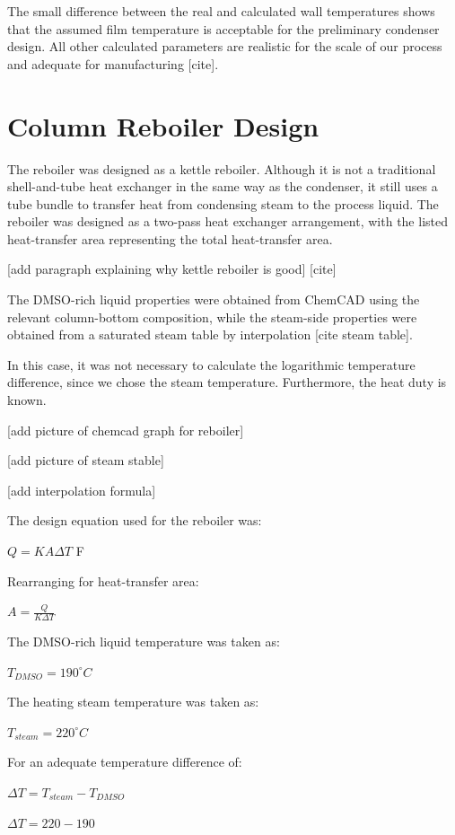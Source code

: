 The small difference between the real and calculated wall temperatures
shows that the assumed film temperature is acceptable for the
preliminary condenser design. All other calculated parameters are
realistic for the scale of our process and adequate for manufacturing
{[}cite{]}.

\section{Column Reboiler Design}\label{column-reboiler-design}

The reboiler was designed as a kettle reboiler. Although it is not a
traditional shell-and-tube heat exchanger in the same way as the
condenser, it still uses a tube bundle to transfer heat from condensing
steam to the process liquid. The reboiler was designed as a two-pass
heat exchanger arrangement, with the listed heat-transfer area
representing the total heat-transfer area.

{[}add paragraph explaining why kettle reboiler is good{]} {[}cite{]}

The DMSO-rich liquid properties were obtained from ChemCAD using the
relevant column-bottom composition, while the steam-side properties were
obtained from a saturated steam table by interpolation {[}cite steam
table{]}.

In this case, it was not necessary to calculate the logarithmic
temperature difference, since we chose the steam temperature.
Furthermore, the heat duty is known.

{[}add picture of chemcad graph for reboiler{]}

{[}add picture of steam stable{]}

{[}add interpolation formula{]}

The design equation used for the reboiler was:

\(Q = K A \Delta T\) F

Rearranging for heat-transfer area:

\(A = \frac{Q}{K \Delta T}\)

The DMSO-rich liquid temperature was taken as:

\(T_{DMSO} = 190^\circ C\)

The heating steam temperature was taken as:

\(T_{steam} = 220^\circ C\)

For an adequate temperature difference of:

\(\Delta T = T_{steam} - T_{DMSO}\)

\(\Delta T = 220 - 190\)


